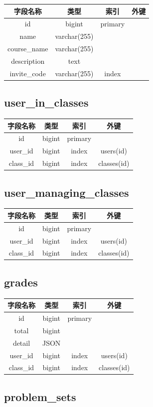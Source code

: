 \documentclass{ctexrep}
\begin{document}
\begin{longtable}[]{@{}cccc@{}}
\toprule
字段名称 & 类型 & 索引 & 外键\tabularnewline
\midrule
id & bigint & primary &\tabularnewline
name & varchar(255) & &\tabularnewline
course_name & varchar(255) & &\tabularnewline
description & text & &\tabularnewline
invite_code & varchar(255) & index &\tabularnewline
\bottomrule
\end{longtable}


\subsection{user_in_classes}



\begin{longtable}[]{@{}cccc@{}}
\toprule
字段名称 & 类型 & 索引 & 外键\tabularnewline
\midrule
id & bigint & primary &\tabularnewline
user_id & bigint & index & users(id)\tabularnewline
class_id & bigint & index & classes(id)\tabularnewline
\bottomrule
\end{longtable}


\subsection{user_managing_classes}



\begin{longtable}[]{@{}cccc@{}}
\toprule
字段名称 & 类型 & 索引 & 外键\tabularnewline
\midrule
id & bigint & primary &\tabularnewline
user_id & bigint & index & users(id)\tabularnewline
class_id & bigint & index & classes(id)\tabularnewline
\bottomrule
\end{longtable}


\subsection{grades}



\begin{longtable}[]{@{}cccc@{}}
\toprule
字段名称 & 类型 & 索引 & 外键\tabularnewline
\midrule
id & bigint & primary &\tabularnewline
total & bigint & &\tabularnewline
detail & JSON & &\tabularnewline
user_id & bigint & index & users(id)\tabularnewline
class_id & bigint & index & classes(id)\tabularnewline
\bottomrule
\end{longtable}


\subsection{problem_sets}
\end{document}
